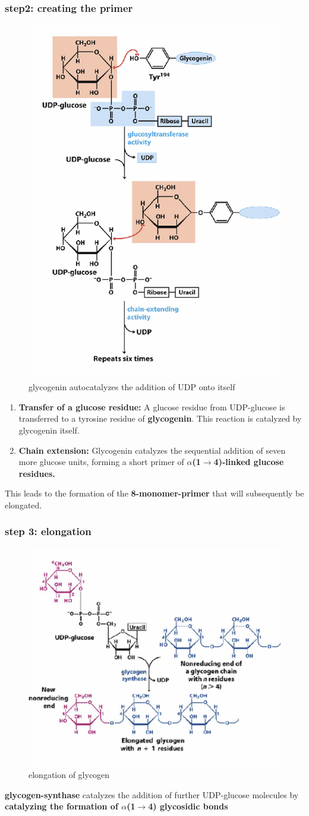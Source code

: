 \documentclass[../main.tex]{subfiles}
\begin{document}
\subsubsection{step2: creating the primer}
\begin{figure}[H]
    \centering
    \includegraphics[width=0.5\linewidth]{primer.png}
    \caption{glycogenin autocatalyzes the addition of UDP onto itself}
    \label{fig:enter-label}
\end{figure}
\begin{enumerate}
    \item \textbf{Transfer of a glucose residue:} A glucose residue from UDP-glucose is transferred to a tyrosine residue of \textbf{\gls{glycogenin}}. This reaction is catalyzed by glycogenin itself.
    \item \textbf{Chain extension:} Glycogenin catalyzes the sequential addition of seven more glucose units, forming a short primer of\textbf{ $\alpha$(1$\rightarrow$4)-linked glucose residues.}
\end{enumerate}

This leads to the formation of the \textbf{8-monomer-primer} that will subsequently be elongated.
\subsubsection{step 3: elongation}
\begin{figure}[H]
    \centering
    \includegraphics[width=0.5\linewidth]{elongation.png}
    \caption{elongation of glycogen}
    \label{fig:enter-label}
\end{figure}
\textbf{\gls{glycogen-synthase}} catalyzes the addition of further UDP-glucose molecules by\textbf{ catalyzing the formation of  $\alpha$(1$\rightarrow$4) glycosidic bonds }
\end{document}

